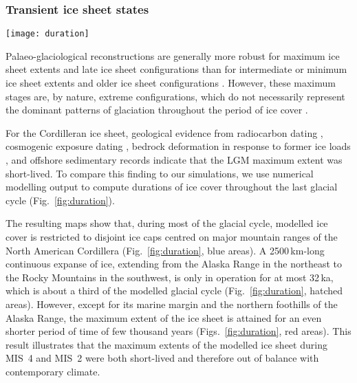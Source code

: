 \documentclass[tc]{copernicus}
\begin{document}
\subsubsection{Transient ice sheet states}

\begin{figure*}
  \texttt{[image: duration]}
  \caption{Modelled duration of ice cover during the last 120\,ka.
           Note the irregular colour scale. A continuous ice cover spanning
           from the Alaska Range (AR) to the southern Coast Mountains (CM) and
           the Columbia and Rocky mountains (RM) exists for about 32\,ka in
           the GRIP simulation and 26\,ka in the EPICA simulation.
           The maximum extent of the ice sheet generally
           corresponds to relatively short durations of ice cover, but ice
           cover persists over the Skeena Mountains (SM) during most of the
           simulation. See Fig.~\ref{locmap} for a list of abbreviations.}
  \label{fig:duration}
\end{figure*}

Palaeo-glaciological reconstructions are generally more robust
for maximum ice sheet extents and late ice sheet configurations than for
intermediate or minimum ice sheet extents and older ice sheet configurations
\citep{Kleman.etal.2010}. However,
these maximum stages are, by nature, extreme configurations, which do not
necessarily represent the dominant patterns of glaciation throughout the period
of ice cover \citep{Porter.1989, Kleman.Stroeven.1997, Kleman.etal.2008,
Kleman.etal.2010}.

For the Cordilleran ice sheet, geological evidence from radiocarbon dating
    \citep{Clague.etal.1980, Clague.1985, Clague.1986, Porter.Swanson.1998,
           Menounos.etal.2008},
cosmogenic exposure dating
    \citep{Stroeven.etal.2010, Stroeven.etal.2014, Margold.etal.2014},
bedrock deformation in response to former ice loads
    \citep{Clague.James.2002, Clague.etal.2005},
and offshore sedimentary records
    \citep{Cosma.etal.2008, Davies.etal.2011}
indicate that the LGM maximum extent was short-lived. To compare this finding
to our simulations, we use numerical modelling output
to compute durations of ice cover throughout the last glacial
cycle (Fig.~\ref{fig:duration}).

The resulting maps show that, during most of the glacial cycle, modelled ice
cover is restricted to disjoint ice caps centred on major mountain ranges of
the North American Cordillera (Fig.~\ref{fig:duration}, blue areas). A
2500\,km-long continuous expanse of ice, extending from the Alaska Range in the
northeast to the Rocky Mountains in the southwest, is only in operation
for at most 32\,ka, which is about a third of the modelled glacial cycle
(Fig.~\ref{fig:duration}, hatched areas). However,
except for its marine margin and the northern foothills of the Alaska Range,
the maximum extent of the ice sheet is attained for an even shorter period
of time of few thousand years (Figs.~\ref{fig:duration}, red areas). This
result illustrates that the maximum extents of the modelled ice sheet during
MIS~4 and MIS~2 were both short-lived and therefore out of balance with
contemporary climate.
\end{document}
